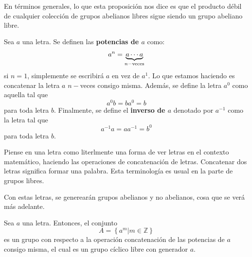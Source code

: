 \documentclass[12pt]{report}
\theoremstyle{largebreak}
\begin{document}
    En términos generales, lo que esta proposición nos dice es que el producto débil de cualquier colección de grupos abelianos libres sigue siendo un grupo abeliano libre.

    \begin{mydef}
        Sea $a$ una letra. Se definen las \textbf{potencias de $a$} como:
        \begin{equation*}
            a^n=\underset{n-\textup{veces}}{\underbrace{a\cdots a}}
        \end{equation*}
        si $n=1$, simplemente se escribirá $a$ en vez de $a^1$. Lo que estamos haciendo es concatenar la letra $a$ $n-$veces consigo misma. Además, se define la letra $a^{0}$ como aquella tal que
        \begin{equation*}
            a^0b=ba^0=b
        \end{equation*}
        para toda letra $b$. Finalmente, se define el \textbf{inverso de $a$} denotado por $a^{-1}$ como la letra tal que
        \begin{equation*}
            a^{-1}a=aa^{-1}=b^{0}
        \end{equation*}
        para toda letra $b$.
    \end{mydef}

    \begin{obs}
        Piense en una letra como literlmente una forma de ver letras en el contexto matemático, haciendo las operaciones de concatenación de letras. Concatenar dos letras significa formar una palabra. Esta terminología es usual en la parte de grupos libres.

        Con estas letras, se generearán grupos abelianos y no abelianos, cosa que se verá más adelante.
    \end{obs}

    \begin{mydef}
        Sea $a$ una letra. Entonces, el conjunto
        \begin{equation*}
            A=\left\{a^m\Big|m\in\mathbb{Z} \right\}
        \end{equation*}
        es un grupo con respecto a la operación concatenación de las potencias de $a$ consigo misma, el cual es un grupo cíclico libre con generador $a$.
    \end{mydef}
\end{document}
